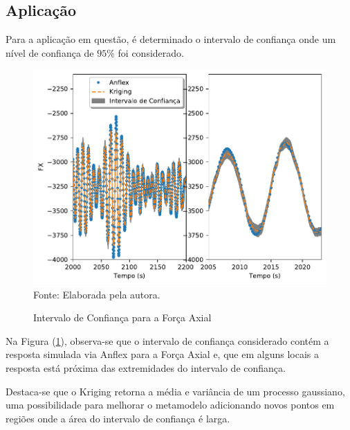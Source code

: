\subsection{Aplicação}

Para a aplicação em questão, é determinado o intervalo de confiança onde um nível de confiança de $95\%$ foi considerado.

\begin{figure}[H]
	\centering
	\caption{Intervalo de Confiança para a Força Axial} 
	{\includegraphics[width=0.7\linewidth]{tatiane/fig_tati/ic/ic_riser1.pdf}} 
	\flushleft \footnotesize{Fonte: Elaborada pela autora.} 
	\label{fig:ic2}
\end{figure}

Na Figura (\ref{fig:ic2}), observa-se que o intervalo de confiança considerado contém a resposta simulada via Anflex para a Força Axial e, que em alguns locais a resposta está próxima das extremidades do intervalo de confiança. 

Destaca-se que o Kriging retorna a média e variância de um processo gaussiano, uma possibilidade para melhorar o metamodelo adicionando novos pontos em regiões onde a área do intervalo de confiança é larga.
